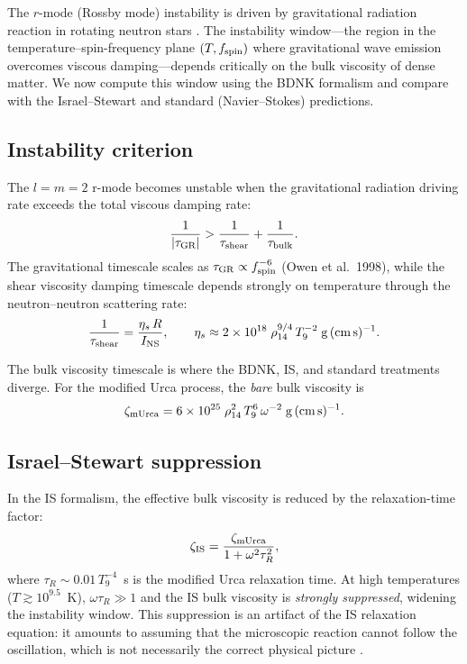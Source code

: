 The $r$-mode (Rossby mode) instability is driven by gravitational
radiation reaction in rotating neutron stars
\cite{AnderssonKokkotas2001,AnderssonKokkotas1999}.  The instability
window---the region in the temperature--spin-frequency plane
$(T, f_{\rm spin})$ where gravitational wave emission overcomes viscous
damping---depends critically on the bulk viscosity of dense matter.  We
now compute this window using the BDNK formalism and compare with the
Israel--Stewart and standard (Navier--Stokes) predictions.

\subsection{Instability criterion}

The $l = m = 2$ r-mode becomes unstable when the gravitational radiation
driving rate exceeds the total viscous damping rate:
\begin{equation}\label{eq:deep11-rmode-criterion}
  \frac{1}{|\tau_{\rm GR}|}
  > \frac{1}{\tau_{\rm shear}} + \frac{1}{\tau_{\rm bulk}}.
\end{equation}
The gravitational timescale scales as $\tau_{\rm GR} \propto
f_{\rm spin}^{-6}$ (Owen et al.\ 1998), while the shear viscosity
damping timescale depends strongly on temperature through the
neutron--neutron scattering rate:
\begin{equation}\label{eq:deep11-tau-shear}
  \frac{1}{\tau_{\rm shear}}
  = \frac{\eta_s\, R}{I_{\rm NS}},
  \qquad
  \eta_s \approx 2 \times 10^{18}\;
  \rho_{14}^{9/4}\, T_9^{-2}\;{\rm g\,(cm\,s)^{-1}}.
\end{equation}

The bulk viscosity timescale is where the BDNK, IS, and standard
treatments diverge.  For the modified Urca process, the \emph{bare} bulk
viscosity is
\begin{equation}\label{eq:deep11-zeta-mUrca}
  \zeta_{\rm mUrca}
  = 6 \times 10^{25}\;\rho_{14}^{2}\, T_9^{6}\,\omega^{-2}
  \;{\rm g\,(cm\,s)^{-1}}.
\end{equation}

\subsection{Israel--Stewart suppression}

In the IS formalism, the effective bulk viscosity is reduced by the
relaxation-time factor:
\begin{equation}\label{eq:deep11-zeta-IS}
  \zeta_{\rm IS} = \frac{\zeta_{\rm mUrca}}{1 + \omega^{2}\tau_R^{2}},
\end{equation}
where $\tau_R \sim 0.01\, T_9^{-4}$~s is the modified Urca relaxation
time.  At high temperatures ($T \gtrsim 10^{9.5}$~K), $\omega\tau_R
\gg 1$ and the IS bulk viscosity is \emph{strongly suppressed}, widening
the instability window.  This suppression is an artifact of the IS
relaxation equation: it amounts to assuming that the microscopic reaction
cannot follow the oscillation, which is not necessarily the correct
physical picture \cite{DR11_NSradialBDNK2025}.

